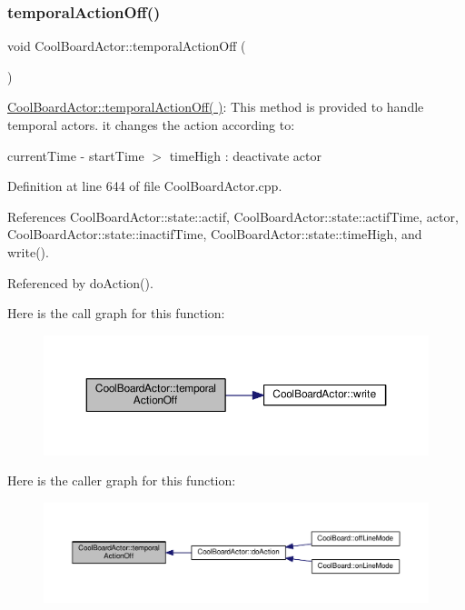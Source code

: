 \subsubsection{\texorpdfstring{temporal\+Action\+Off()}{temporalActionOff()}}
{\footnotesize\ttfamily void Cool\+Board\+Actor\+::temporal\+Action\+Off (\begin{DoxyParamCaption}{ }\end{DoxyParamCaption})}

\hyperlink{class_cool_board_actor_a02698bd647df49cabbe74513d4d88918}{Cool\+Board\+Actor\+::temporal\+Action\+Off( )}\+: This method is provided to handle temporal actors. it changes the action according to\+:

current\+Time -\/ start\+Time $>$ time\+High \+: deactivate actor 

Definition at line 644 of file Cool\+Board\+Actor.\+cpp.



References Cool\+Board\+Actor\+::state\+::actif, Cool\+Board\+Actor\+::state\+::actif\+Time, actor, Cool\+Board\+Actor\+::state\+::inactif\+Time, Cool\+Board\+Actor\+::state\+::time\+High, and write().



Referenced by do\+Action().

Here is the call graph for this function\+:
\nopagebreak
\begin{figure}[H]
\begin{center}
\leavevmode
\includegraphics[width=350pt]{dc/d69/class_cool_board_actor_a02698bd647df49cabbe74513d4d88918_cgraph}
\end{center}
\end{figure}
Here is the caller graph for this function\+:
\nopagebreak
\begin{figure}[H]
\begin{center}
\leavevmode
\includegraphics[width=350pt]{dc/d69/class_cool_board_actor_a02698bd647df49cabbe74513d4d88918_icgraph}
\end{center}
\end{figure}
\mbox{\label{class_cool_board_actor_ada603785c203fdb0b41cc967d70bdc4d}} 
